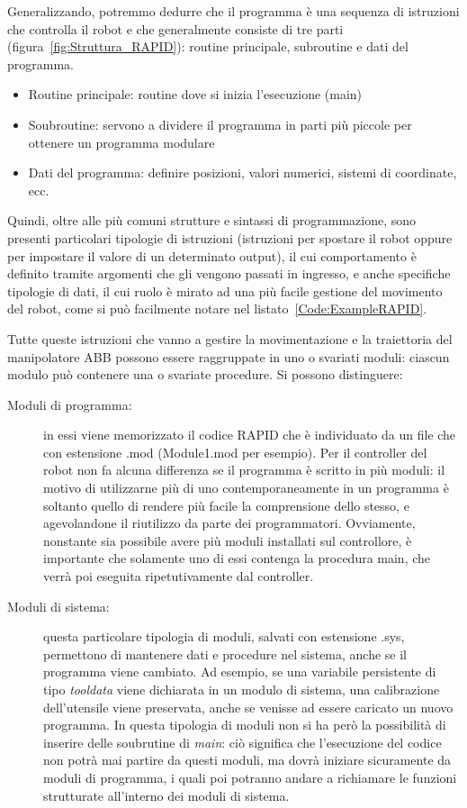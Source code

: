 Generalizzando, potremmo dedurre che il programma è una sequenza di istruzioni
che controlla il robot e che generalmente consiste di tre parti (figura~\vref{fig:Struttura_RAPID}): routine principale, subroutine e dati del programma.
\begin{itemize}
	\item Routine principale: routine dove si inizia l'esecuzione (main)
	\item Soubroutine: servono a dividere il programma in parti più piccole	per ottenere un programma modulare
	\item Dati del programma: definire posizioni, valori numerici, sistemi di
	coordinate, ecc. 
\end{itemize}

Quindi, oltre alle più comuni strutture e sintassi di programmazione, sono presenti particolari tipologie di istruzioni (istruzioni per spostare il robot oppure per impostare il valore di un determinato output), il cui comportamento è definito tramite argomenti che gli vengono passati in ingresso, e anche specifiche tipologie di dati, il cui ruolo è mirato ad una più facile gestione del movimento del robot, come si può facilmente notare nel listato~\vref{Code:ExampleRAPID}.

Tutte queste istruzioni che vanno a gestire la movimentazione e la traiettoria del manipolatore ABB possono essere raggruppate in uno o svariati moduli: ciascun modulo può contenere una o svariate procedure.
\label{Text:Mod_sys}
Si possono distinguere:
\begin{description}
	\item[Moduli di programma:] in essi viene memorizzato il codice RAPID che è individuato da un file che con estensione .mod (Module1.mod per esempio).
	Per il controller del robot non fa alcuna differenza se il programma è scritto in più moduli: il motivo di utilizzarne più di uno contemporaneamente in un programma è soltanto quello di rendere più facile la comprensione dello stesso, e agevolandone il riutilizzo da parte dei programmatori. Ovviamente, nonstante sia possibile avere più moduli installati sul controllore, è importante che solamente uno di essi contenga la procedura main, che verrà poi eseguita ripetutivamente dal controller.
	\label{text:SysModule}
	\item[Moduli di sistema:] questa particolare tipologia di moduli, salvati con estensione .sys, permettono di mantenere dati e procedure nel sistema, anche se il programma viene
	cambiato. Ad esempio, se una variabile persistente di tipo \emph{tooldata} viene dichiarata in un modulo di sistema, una calibrazione dell’utensile viene preservata, anche se venisse ad essere caricato un nuovo programma. 
	In questa tipologia di moduli non si ha però la possibilità di inserire delle soubrutine di \emph{main}: ciò significa che l'esecuzione del codice non potrà mai partire da questi moduli, ma dovrà iniziare sicuramente da moduli di programma, i quali poi potranno andare a richiamare le funzioni strutturate all'interno dei moduli di sistema.
\end{description}


